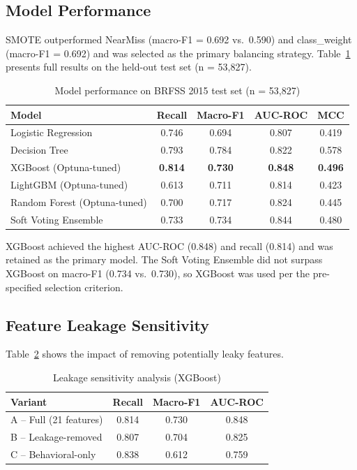﻿\documentclass[12pt,a4paper]{article}
\begin{document}
\subsection{Model Performance}

SMOTE outperformed NearMiss (macro-F1 = 0.692 vs.\ 0.590) and class\_weight (macro-F1 = 0.692)
and was selected as the primary balancing strategy. Table~\ref{tab:models} presents full
results on the held-out test set (n = 53,827).

\begin{table}[h]
\centering
\caption{Model performance on BRFSS 2015 test set (n = 53,827)}
\label{tab:models}
\begin{tabular}{lcccc}
\toprule
\textbf{Model} & \textbf{Recall} & \textbf{Macro-F1} & \textbf{AUC-ROC} & \textbf{MCC} \\
\midrule
Logistic Regression       & 0.746 & 0.694 & 0.807 & 0.419 \\
Decision Tree             & 0.793 & 0.784 & 0.822 & 0.578 \\
XGBoost (Optuna-tuned)    & \textbf{0.814} & \textbf{0.730} & \textbf{0.848} & \textbf{0.496} \\
LightGBM (Optuna-tuned)   & 0.613 & 0.711 & 0.814 & 0.423 \\
Random Forest (Optuna-tuned) & 0.700 & 0.717 & 0.824 & 0.445 \\
Soft Voting Ensemble      & 0.733 & 0.734 & 0.844 & 0.480 \\
\bottomrule
\end{tabular}
\end{table}

XGBoost achieved the highest AUC-ROC (0.848) and recall (0.814) and was retained as the
primary model. The Soft Voting Ensemble did not surpass XGBoost on macro-F1 (0.734 vs.\
0.730), so XGBoost was used per the pre-specified selection criterion.

\subsection{Feature Leakage Sensitivity}

Table~\ref{tab:leakage} shows the impact of removing potentially leaky features.

\begin{table}[h]
\centering
\caption{Leakage sensitivity analysis (XGBoost)}
\label{tab:leakage}
\begin{tabular}{lccc}
\toprule
\textbf{Variant} & \textbf{Recall} & \textbf{Macro-F1} & \textbf{AUC-ROC} \\
\midrule
A -- Full (21 features)       & 0.814 & 0.730 & 0.848 \\
B -- Leakage-removed          & 0.807 & 0.704 & 0.825 \\
C -- Behavioral-only          & 0.838 & 0.612 & 0.759 \\
\bottomrule
\end{tabular}
\end{table}
\end{document}
